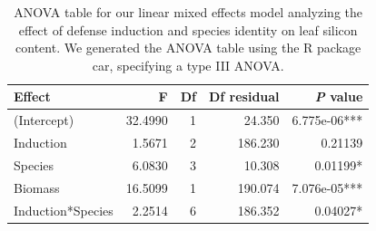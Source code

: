\documentclass[12pt, letterpaper, ]{report}
\begin{document}
\begin{table}[ht]
        \centering
        \caption{ANOVA table for our linear mixed effects model analyzing the effect of defense induction and species identity on leaf silicon content. We generated the ANOVA table using the R package car, specifying a type III ANOVA.}
        \label{Tab:params}
        \begin{tabular}{lrrrr}
                \hline
                \textbf{Effect} & \textbf{F} & \textbf{Df} & \textbf{Df residual} & \textbf{\textit{P} value} \\
                \hline
                (Intercept) & 32.4990 & 1 & 24.350 & 6.775e-06*** \\
                Induction & 1.5671 & 2 & 186.230 & 0.21139 \\   
                Species & 6.0830 & 3 & 10.308 & 0.01199* \\ 
                Biomass & 16.5099 & 1 & 190.074 & 7.076e-05*** \\
                Induction*Species & 2.2514 & 6 & 186.352 & 0.04027* \\
                \hline
        \end{tabular}
\end{table}
\end{document}
